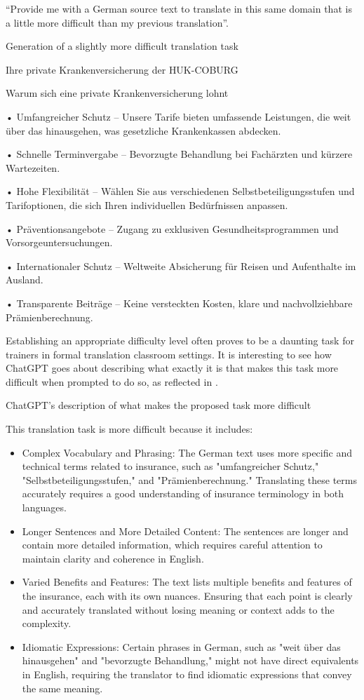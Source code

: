 \documentclass[output=paper]{langscibook}
\begin{document}
\ea\label{ex:2:provideme}
“Provide me with a German source text to translate in this same domain that is a little more difficult than my previous translation”.
\z

\ea\label{extab:2:7}
Generation of a slightly more difficult translation task

\ttfamily\raggedright
Ihre private Krankenversicherung der HUK-COBURG

Warum sich eine private Krankenversicherung lohnt

• Umfangreicher Schutz – Unsere Tarife bieten umfassende Leistungen, die weit über das hinausgehen, was gesetzliche Krankenkassen abdecken.

• Schnelle Terminvergabe – Bevorzugte Behandlung bei Fachärzten und kürzere Wartezeiten.

• Hohe Flexibilität – Wählen Sie aus verschiedenen Selbstbeteiligungsstufen und Tarifoptionen, die sich Ihren individuellen Bedürfnissen anpassen.

• Präventionsangebote – Zugang zu exklusiven Gesundheitsprogrammen und Vorsorgeuntersuchungen.

• Internationaler Schutz – Weltweite Absicherung für Reisen und Aufenthalte im Ausland.

• Transparente Beiträge – Keine versteckten Kosten, klare und nachvollziehbare Prämienberechnung.
\z

Establishing an appropriate difficulty level often proves to be a daunting task for trainers in formal translation classroom settings. It is interesting to see how ChatGPT goes about describing what exactly it is that makes this task more difficult when prompted to do so, as reflected in .

\ea\label{extab:2:8}
ChatGPT’s description of what makes the proposed task more difficult

\ttfamily\raggedright
This translation task is more difficult because it includes:

\begin{itemize}
\item  Complex Vocabulary and Phrasing: The German text uses more specific and technical terms related to insurance, such as "umfangreicher Schutz," "Selbstbeteiligungsstufen," and "Prämienberechnung." Translating these terms accurately requires a good understanding of insurance terminology in both languages.
\item  Longer Sentences and More Detailed Content: The sentences are longer and contain more detailed information, which requires careful attention to maintain clarity and coherence in English.
\item Varied Benefits and Features: The text lists multiple benefits and features of the insurance, each with its own nuances. Ensuring that each point is clearly and accurately translated without losing meaning or context adds to the complexity.
\item Idiomatic Expressions: Certain phrases in German, such as "weit über das hinausgehen" and "bevorzugte Behandlung," might not have direct equivalents in English, requiring the translator to find idiomatic expressions that convey the same meaning.
\end{itemize}
\z
\end{document}

